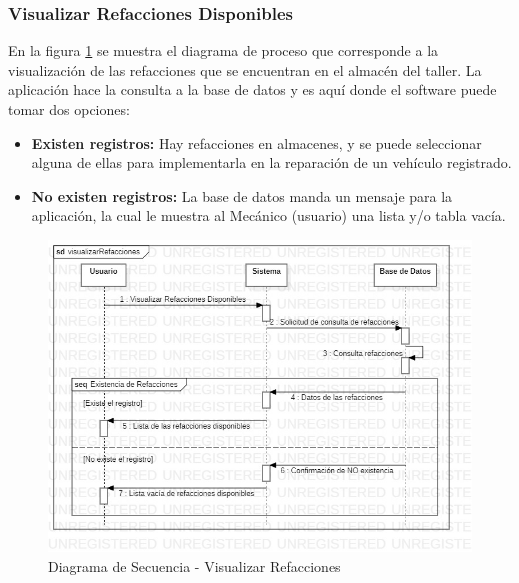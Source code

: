 \subsubsection{Visualizar Refacciones Disponibles}
En la figura \ref{fig:Diagrama de Secuencia - Visualizar Refacciones} se muestra el diagrama de proceso que corresponde a la visualización de las refacciones que se encuentran en el almacén del taller. La aplicación hace la consulta a la base de datos y es aquí donde el software puede tomar dos opciones: 
\begin{itemize}
	\item \textbf{Existen registros:} Hay refacciones en almacenes, y se puede seleccionar alguna de ellas para implementarla en la reparación de un vehículo registrado.
	\item \textbf{No existen registros:} La base de datos manda un mensaje para la aplicación, la cual le muestra al Mecánico (usuario) una lista y/o tabla vacía. 
\end{itemize} 
\begin{figure}[!h]
	\centering
	\includegraphics[width=1\textwidth]{./diseno/vprocesos/imagenes/visualizarRefacciones}
	\caption{Diagrama de Secuencia - Visualizar Refacciones}
	\label{fig:Diagrama de Secuencia - Visualizar Refacciones}
\end{figure}
